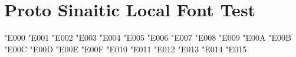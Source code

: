 \documentclass{article}
\begin{document}
\section*{Proto Sinaitic Local Font Test}

{\psfont\Huge
\char"E000 \char"E001 \char"E002 \char"E003 \char"E004
\char"E005 \char"E006 \char"E007 \char"E008 \char"E009
\char"E00A \char"E00B \char"E00C \char"E00D \char"E00E
\char"E00F \char"E010 \char"E011 \char"E012 \char"E013
\char"E014 \char"E015
}
\end{document}

